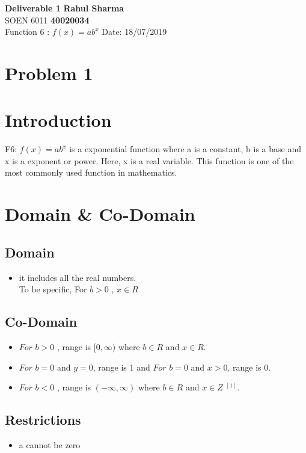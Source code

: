 \documentclass[a4paper, 11pt]{article}
\begin{document}
\noindent
\large\textbf{Deliverable 1} \hfill \textbf{Rahul Sharma} \\
\normalsize SOEN 6011 \hfill \textbf{40020034} \\
Function 6 :  $f(x)= ab^x$  \hfill Date: 18/07/2019 \\

\section*{Problem 1}
\section{Introduction}

F6:  $f(x)= ab^x$ is a exponential function where a is a constant, b is a base and x is a exponent or power. Here, x is a  real variable. This function is one of the most commonly used function in mathematics.

\section{Domain \& Co-Domain}

\subsection{Domain}
\begin{itemize}
  \item it includes all the real numbers. \\
   To be specific,  For  $ b > 0$ ,  $x \in R$	
 \end{itemize}
  
 \subsection{Co-Domain}
 \begin{itemize}
  \item  $For$ $ b > 0$ , range is $[0,\infty)$  where $ b \in R$  and  $x \in R$. 
  \item  $For$ $ b = 0$ and $y =0$, range is 1 and  $For$ $ b = 0$ and $x>0$, range is 0.
 \item  $For$ $ b < 0$ , range is $(-\infty,\infty)$  where $ b \in R$  and  $x \in Z$ $^{[1]}$.
\end{itemize}
 \subsection{Restrictions}
 \begin{itemize}
  \item  a cannot be zero
\end{itemize}
\end{document}
